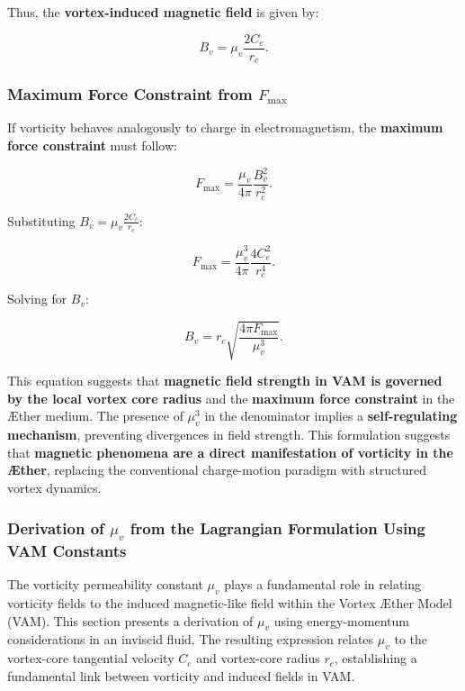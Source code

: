     Thus, the \textbf{vortex-induced magnetic field} is given by:

    \begin{equation*}
        B_v = \mu_v \frac{2 C_e}{r_c}.
    \end{equation*}

    \subsubsection*{Maximum Force Constraint from \( F_{\text{max}} \)}
    If vorticity behaves analogously to charge in electromagnetism, the \textbf{maximum force constraint} must follow:

    \begin{equation*}
        F_{\text{max}} = \frac{\mu_v}{4\pi} \frac{B_v^2}{r_c^2}.
    \end{equation*}

    Substituting \( B_v = \mu_v \frac{2 C_e}{r_c} \):

    \begin{equation*}
        F_{\text{max}} = \frac{\mu_v^3}{4\pi} \frac{4 C_e^2}{r_c^4}.
    \end{equation*}

    Solving for \( B_v \):

    \begin{equation*}
        B_v = r_c \sqrt{\frac{4\pi F_{\text{max}}}{\mu_v^3}}.
    \end{equation*}

    This equation suggests that \textbf{magnetic field strength in VAM is governed by the local vortex core radius} and the \textbf{maximum force constraint} in the Æther medium. The presence of \( \mu_v^3 \) in the denominator implies a \textbf{self-regulating mechanism}, preventing divergences in field strength.  This formulation suggests that \textbf{magnetic phenomena are a direct manifestation of vorticity in the Æther}, replacing the conventional charge-motion paradigm with structured vortex dynamics.

\subsubsection*{Derivation of \( \mu_v \) from the Lagrangian Formulation Using VAM Constants}
The vorticity permeability constant \( \mu_v \) plays a fundamental role in relating vorticity fields to the induced magnetic-like field within the Vortex Æther Model (VAM). This section presents a derivation of \( \mu_v \) using energy-momentum considerations in an inviscid fluid. The resulting expression relates \( \mu_v \) to the vortex-core tangential velocity \( C_e \) and vortex-core radius \( r_c \), establishing a fundamental link between vorticity and induced fields in VAM.

